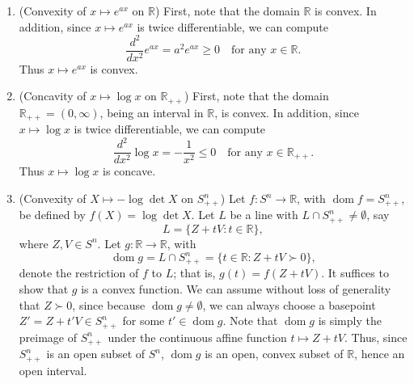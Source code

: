 \documentclass[letterpaper,12pt]{article}
\DeclareMathOperator{\dom}{dom}
\begin{document}
\begin{enumerate}
\item (Convexity of $x \mapsto e^{ax}$ on $\mathbb{R}$) First, note
  that the domain $\mathbb{R}$ is convex. In addition, since
  $x \mapsto e^{ax}$ is twice differentiable, we can compute
  \begin{equation*}
    \frac{d^2}{dx^2} e^{ax} = a^2 e^{ax} \geq 0
    \quad \text{for any $x \in \mathbb{R}$}.
  \end{equation*}
  Thus $x \mapsto e^{ax}$ is convex.

\item (Concavity of $x \mapsto \log x$ on $\mathbb{R}_{++}$) First,
  note that the domain $\mathbb{R}_{++} = (0, \infty)$, being an
  interval in $\mathbb{R}$, is convex. In addition, since
  $x \mapsto \log x$ is twice differentiable, we can compute
  \begin{equation*}
    \frac{d^2}{dx^2} \log x = -\frac{1}{x^2} \leq 0
    \quad \text{for any $x \in \mathbb{R}_{++}$}.
  \end{equation*}
  Thus $x \mapsto \log x$ is concave.

\item (Convexity of $X \mapsto -\log \det X$ on $S^n_{++}$) Let
  $f : S^n \to \mathbb{R}$, with $\dom f = S^n_{++}$, be defined by
  $f(X) = \log \det X$. Let $L$ be a line with
  $L \cap S^n_{++} \neq \emptyset$, say
  \begin{equation*}
    L = \{Z + tV : t \in \mathbb{R}\},
  \end{equation*}
  where $Z, V \in S^n$. Let $g : \mathbb{R} \to \mathbb{R}$, with
  \begin{equation*}
    \dom g = L \cap S^n_{++} = \{t \in \mathbb{R} : Z + tV \succ 0\},
  \end{equation*}
  denote the restriction of $f$ to $L$; that is, $g(t) = f(Z +
  tV)$. It suffices to show that $g$ is a convex function. We can
  assume without loss of generality that $Z \succ 0$, since because
  $\dom g \neq \emptyset$, we can always choose a basepoint
  $Z' = Z + t' V \in S^n_{++}$ for some $t' \in \dom g$. Note that
  $\dom g$ is simply the preimage of $S^n_{++}$ under the continuous
  affine function $t \mapsto Z + tV$. Thus, since $S^n_{++}$ is an
  open subset of $S^n$, $\dom g$ is an open, convex subset of
  $\mathbb{R}$, hence an open interval.


\end{enumerate}
\end{document}
